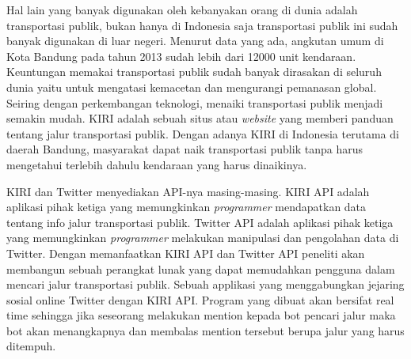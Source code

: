 Hal lain yang banyak digunakan oleh kebanyakan orang di dunia adalah transportasi publik, bukan hanya di Indonesia saja transportasi publik ini sudah banyak digunakan di luar negeri. Menurut data yang ada, angkutan umum di Kota Bandung pada tahun 2013 sudah lebih dari 12000 unit kendaraan. Keuntungan memakai transportasi publik sudah banyak dirasakan di seluruh dunia yaitu untuk mengatasi kemacetan dan mengurangi pemanasan global. Seiring dengan perkembangan teknologi, menaiki transportasi publik menjadi semakin mudah. KIRI adalah sebuah situs atau \textit{website} yang memberi panduan tentang jalur transportasi publik. Dengan adanya KIRI di Indonesia terutama di daerah Bandung, masyarakat dapat naik transportasi publik tanpa harus mengetahui terlebih dahulu kendaraan yang harus dinaikinya. 

KIRI dan Twitter menyediakan API-nya masing-masing. KIRI API adalah aplikasi pihak ketiga yang memungkinkan \textit{programmer} mendapatkan data tentang info jalur transportasi publik. Twitter API adalah aplikasi pihak ketiga yang memungkinkan \textit{programmer} melakukan manipulasi dan pengolahan data di Twitter. Dengan memanfaatkan KIRI API dan Twitter API peneliti akan membangun sebuah perangkat lunak yang dapat memudahkan pengguna dalam mencari jalur transportasi publik. Sebuah applikasi yang menggabungkan jejaring sosial online Twitter dengan KIRI API. Program yang dibuat akan bersifat real time sehingga jika seseorang melakukan mention kepada bot pencari jalur maka bot akan menangkapnya dan membalas mention tersebut berupa jalur yang harus ditempuh.%


